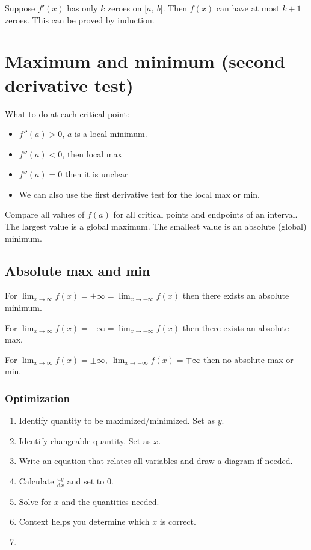 \documentclass[12pt]{article}
\theoremstyle{plain}
\theoremstyle{remark}
\theoremstyle{definition}
\begin{document}
Suppose \(f'(x)\) has only \(k\) zeroes on \(\lbrack a,\ b\rbrack\).
Then \(f(x)\) can have at most \(k + 1\) zeroes. This can be proved by
induction.


\section{Maximum and minimum (second derivative
test)}

What to do at each critical point:

\begin{itemize}
\item
  \(f''(a) > 0\), \(a\) is a local minimum.
\item
  \(f''(a) < 0\), then local max
\item
  \(f''(a) = 0\) then it is unclear
\item
  We can also use the first derivative test for the local max or min.
\end{itemize}

Compare all values of \(f(a)\) for all critical points and endpoints of
an interval. The largest value is a global maximum. The smallest value
is an absolute (global) minimum.


\subsection{Absolute max and min}

For
\(\lim_{x \rightarrow \infty}{f(x)} = + \infty = \lim_{x \rightarrow - \infty}{f(x)}\)
then there exists an absolute minimum.

For
\(\lim_{x \rightarrow \infty}{f(x)} = - \infty = \lim_{x \rightarrow - \infty}{f(x)}\)
then there exists an absolute max.


For
\(\lim_{x \rightarrow \infty}{f(x)} = \pm \infty,\ \lim_{x \rightarrow - \infty}{f(x)} = \mp \infty\)
then no absolute max or min.


\subsubsection{\texorpdfstring{
Optimization}{ Optimization}}

\begin{enumerate}
\def\labelenumi{\arabic{enumi}.}
\item
  Identify quantity to be maximized/minimized. Set as \(y\).
\item
  Identify changeable quantity. Set as \(x\).
\item
  Write an equation that relates all variables and draw a diagram if
  needed.
\item
  Calculate \(\frac{\text{d}y}{\text{d}x}\) and set to 0.
\item
  Solve for \(x\) and the quantities needed.
\item
  Context helps you determine which \(x\) is correct.
\item
  -\\
\end{enumerate}
\end{document}
